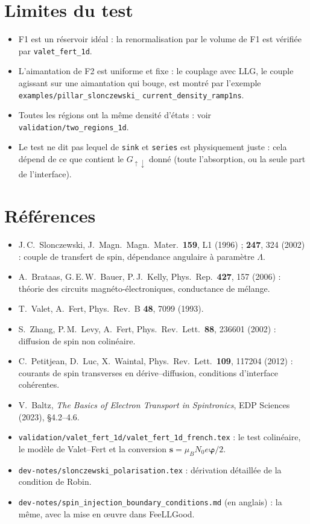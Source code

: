 \documentclass[11pt,a4paper]{article}
\newcommand{\vs}{\bm{s}}
\newcommand{\vphi}{\bm{\varphi}}
\begin{document}
\section{Limites du test}

\begin{itemize}
  \item F1 est un réservoir idéal : la renormalisation par le volume de F1
    est vérifiée par \texttt{valet\_fert\_1d}.
  \item L'aimantation de F2 est uniforme et fixe : le couplage avec LLG,
    le couple agissant sur une aimantation qui bouge, est montré par
    l'exemple \texttt{examples/}\allowbreak\texttt{pillar\_slonczewski\_}\allowbreak
    \texttt{current\_density\_ramp1ns}.
  \item Toutes les régions ont la même densité d'états : voir
    \texttt{validation/two\_regions\_1d}.
  \item Le test ne dit pas lequel de \texttt{sink} et \texttt{series} est
    physiquement juste : cela dépend de ce que contient le
    $G_{\uparrow\downarrow}$ donné (toute l'absorption, ou la seule part
    de l'interface).
\end{itemize}

\section*{Références}

\begin{itemize}
  \item J.\,C.~Slonczewski, J.~Magn.\ Magn.\ Mater.\ \textbf{159}, L1
    (1996) ; \textbf{247}, 324 (2002) : couple de transfert de spin,
    dépendance angulaire à paramètre $\Lambda$.
  \item A.~Brataas, G.\,E.\,W.~Bauer, P.\,J.~Kelly, Phys.\ Rep.\
    \textbf{427}, 157 (2006) : théorie des circuits magnéto-électroniques,
    conductance de mélange.
  \item T.~Valet, A.~Fert, Phys.\ Rev.\ B \textbf{48}, 7099 (1993).
  \item S.~Zhang, P.\,M.~Levy, A.~Fert, Phys.\ Rev.\ Lett.\ \textbf{88},
    236601 (2002) : diffusion de spin non colinéaire.
  \item C.~Petitjean, D.~Luc, X.~Waintal, Phys.\ Rev.\ Lett.\
    \textbf{109}, 117204 (2012) : courants de spin transverses en
    dérive--diffusion, conditions d'interface cohérentes.
  \item V.~Baltz, \emph{The Basics of Electron Transport in Spintronics},
    EDP Sciences (2023), §4.2--4.6.
  \item \texttt{validation/valet\_fert\_1d/valet\_fert\_1d\_french.tex} :
    le test colinéaire, le modèle de Valet--Fert et la conversion
    $\vs = \mu_BN_0e\vphi/2$.
  \item \texttt{dev-notes/slonczewski\_polarisation.tex} : dérivation
    détaillée de la condition de Robin.
  \item \texttt{dev-notes/spin\_injection\_boundary\_conditions.md} (en
    anglais) : la même, avec la mise en œuvre dans FeeLLGood.
\end{itemize}
\end{document}
